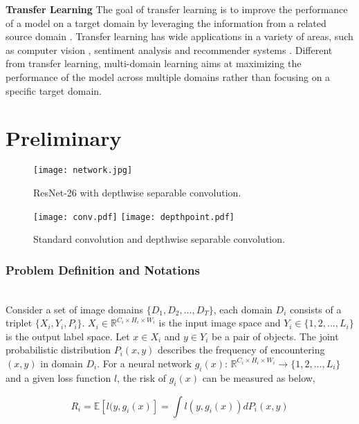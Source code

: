 \documentclass[letterpaper]{article} \usepackage{aaai19}  \usepackage{times}  \usepackage{helvet}  \usepackage{courier}  \usepackage{url}  \usepackage{graphicx}  \usepackage{amssymb}
\begin{document}
\noindent\textbf{Transfer Learning} The goal of transfer learning is to improve the performance of a model on a target domain by leveraging the information from a related source domain \cite{pan2010survey,bengio2012deep,hu2015deep}. Transfer learning has wide applications in a variety of areas, such as computer vision \cite{raina2007self}, sentiment analysis \cite{glorot2011domain} and recommender systems 
\cite{pan2010transfer,guo2015crorank}. Different from transfer learning, multi-domain learning aims at maximizing the performance of the model across multiple domains rather than focusing on a specific target domain.
\\



\section{Preliminary}
 \begin{figure*}[t]
\centering
\texttt{[image: network.jpg]}
\caption{ResNet-26 with depthwise separable convolution.}
\label{fig: arch}
\end{figure*}

\begin{figure}[h]
\centering
     \texttt{[image: conv.pdf]}
     \hfil
     \texttt{[image: depthpoint.pdf]}
\caption{Standard convolution and depthwise separable convolution.}   \label{fig: convs}
\end{figure}

\subsubsection{Problem Definition and Notations} ~\\
\noindent Consider a set of image domains $\{D_1, D_2, ..., D_T\}$, each domain $D_i$ consists of a triplet $\{X_i, Y_i, P_i\}$. $X_i \in \mathbb{R}^{C_i \times H_i\times W_i}$ is the input image space and $Y_i \in \{1,2,...,L_i\}$ is the output label space. Let $x \in X_i$ and $y \in Y_i$ be a pair of objects. The joint probabilistic distribution $P_i(x,y)$ describes the frequency of encountering $(x, y)$ in domain $D_i$. For a neural network $g_i(x)$: $\mathbb{R}^{C_i \times H_i\times W_i} \rightarrow \{1,2,...,L_i\}$ and a given loss function $l$, the risk of $g_i(x)$ can be measured as below,

\begin{equation}
    R_i = \mathbb{E}[l(y,g_i(x)] = \int l(y,g_i(x))d P_i(x,y)
\end{equation}
\end{document}
